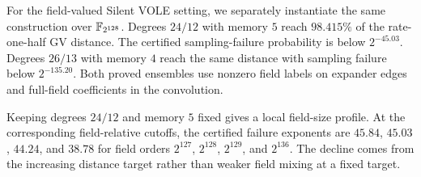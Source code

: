 For the field-valued Silent VOLE setting, we separately instantiate the same
construction over $\mathbb F_{2^{128}}$.  Degrees $24/12$ with memory $5$ reach
$98.415\%$ of the rate-one-half GV distance.  The certified sampling-failure
probability is below $2^{-45.03}$.  Degrees $26/13$ with memory $4$ reach the
same distance with sampling failure below $2^{-135.20}$.  Both proved
ensembles use nonzero field labels on expander edges and full-field
coefficients in the convolution.

Keeping degrees $24/12$ and memory $5$ fixed gives a local field-size
profile.  At the corresponding field-relative cutoffs, the certified failure
exponents are $45.84$, $45.03$, $44.24$, and $38.78$ for field orders
$2^{127}$, $2^{128}$, $2^{129}$, and $2^{136}$.  The decline comes from the
increasing distance target rather than weaker field mixing at a fixed target.

